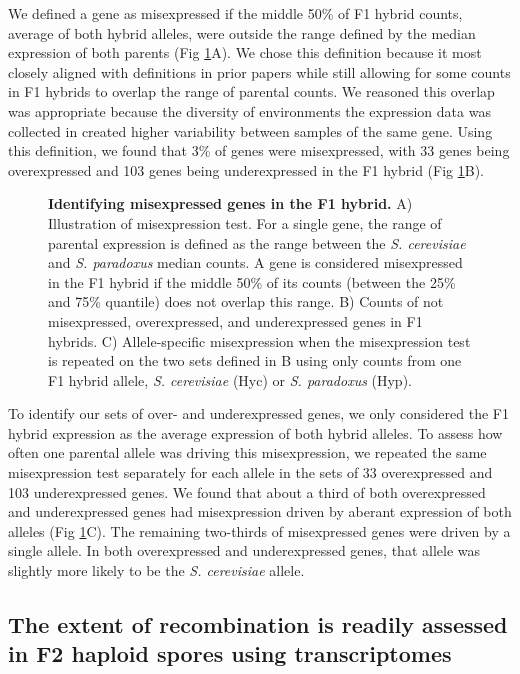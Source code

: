We defined a gene as misexpressed if the middle 50\% of F1 hybrid counts, average of both hybrid alleles, were outside the range defined by the median expression of both parents (Fig \ref{fig:id}A). We chose this definition because it most closely aligned with definitions in prior papers \cite{Landry2005, McManus2014} while still allowing for some counts in F1 hybrids to overlap the range of parental counts. We reasoned this overlap was appropriate because the diversity of environments the expression data was collected in created higher variability between samples of the same gene. Using this definition, we found that 3\% of genes were misexpressed, with 33 genes being overexpressed and 103 genes being underexpressed in the F1 hybrid (Fig \ref{fig:id}B).

\begin{figure}
    \centering
    \caption{\textbf{Identifying misexpressed genes in the F1 hybrid.} A) Illustration of misexpression test. For a single gene, the range of parental expression is defined as the range between the \textit{S. cerevisiae} and \textit{S. paradoxus} median counts. A gene is considered misexpressed in the F1 hybrid if the middle 50\% of its counts (between the 25\% and 75\% quantile) does not overlap this range. B) Counts of not misexpressed, overexpressed, and underexpressed genes in F1 hybrids. C) Allele-specific misexpression when the misexpression test is repeated on the two sets defined in B using only counts from one F1 hybrid allele, \textit{S. cerevisiae} (Hyc) or \textit{S. paradoxus} (Hyp).}
    \label{fig:id}
\end{figure}

To identify our sets of over- and underexpressed genes, we only considered the F1 hybrid expression as the average expression of both hybrid alleles. To assess how often one parental allele was driving this misexpression, we repeated the same misexpression test separately for each allele in the sets of 33 overexpressed and 103 underexpressed genes. We found that about a third of both overexpressed and underexpressed genes had misexpression driven by aberant expression of both alleles (Fig \ref{fig:id}C). The remaining two-thirds of misexpressed genes were driven by a single allele. In both overexpressed and underexpressed genes, that allele was slightly more likely to be the \textit{S. cerevisiae} allele.

\subsection{The extent of recombination is readily assessed in F2 haploid spores using transcriptomes}

